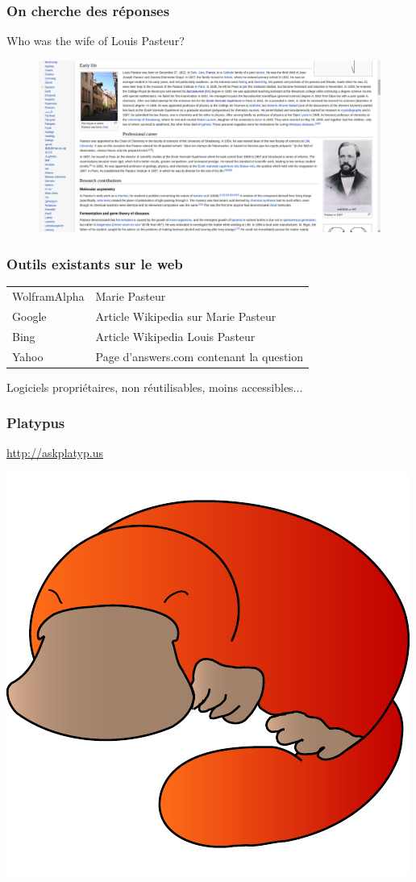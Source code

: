 \begin{frame}
    \frametitle{On cherche des réponses}
    \alert{Who was the wife of Louis Pasteur?}
    \begin{figure}
        \includegraphics[width=\textwidth]{pasteurWiki.png}
    \end{figure}
\end{frame}

\begin{frame}
    \frametitle{Outils existants sur le web}
    \begin{tabular}{ll}
        WolframAlpha & Marie Pasteur\\
        Google & Article Wikipedia sur Marie Pasteur\\
        Bing & Article Wikipedia Louis Pasteur\\
        Yahoo & Page d'answers.com contenant la question
    \end{tabular}
\medbreak
\alert{Logiciels propriétaires, non réutilisables, moins accessibles...}
\end{frame}

\begin{frame}
    \frametitle{Platypus}
    \begin{center}
        \alert{\url{http://askplatyp.us}}
        
        \bigskip
        
        \includegraphics[width=0.6\linewidth]{figures/platypus.pdf}
    \end{center}
\end{frame}

